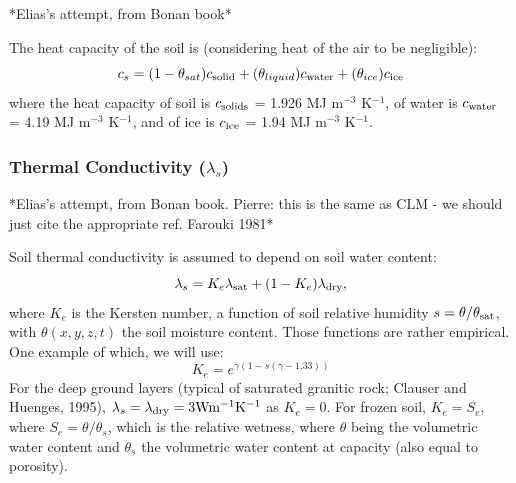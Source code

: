 \documentclass{article}
\begin{document}
*Elias's attempt, from Bonan book*

The heat capacity of the soil is (considering heat of the air to be negligible):
\begin{equation}
c_s = (1- \theta_{sat} ) c_{\rm solid} + (\theta_{liquid}) c_{\rm water} + (\theta_{ice}) c_{\rm ice}
\end{equation}
where the heat capacity of soil is $c_{\rm solids}$ = 1.926 MJ m$^{-3}$ K$^{-1}$, of water is $c_{\rm water}$ = 4.19 MJ m$^{-3}$ K$^{-1}$, and of ice is $c_{\rm ice}$ = 1.94 MJ m$^{-3}$ K$^{-1}$. 

\subsubsection{Thermal Conductivity ($\lambda_s$)}
*Elias's attempt, from Bonan book. Pierre: this is the same as CLM - we should just cite the appropriate ref. Farouki 1981*

Soil thermal conductivity is assumed to depend on soil water content:
\begin{equation}
\lambda_s = K_e \lambda_{\rm sat} + (1-K_e) \lambda_{\rm dry},
\end{equation}
where $K_e$ is the Kersten number, a function of soil relative humidity $s=\theta/\theta_{\rm sat}$, with $\theta(x,y,z,t)$ the soil moisture content. Those functions are rather empirical. One example of which, we will use:
\begin{equation}
K_e = e^{ \gamma(1-s(\gamma-1.33))}
\end{equation} 
For  the  deep  ground  layers  (typical  of  saturated  granitic  rock;  Clauser  and  Huenges,  1995), $\lambda_s =  \lambda_{\rm dry} = 3 \rm W  m^{-1}  K^{-1}$ as $K_e=0$.
For frozen soil, $K_e=S_e$, where $S_e=\theta / \theta_s$, which is the relative wetness, where $\theta$ being the volumetric water content and $\theta_s$ the volumetric water content at capacity (also equal to porosity).
\end{document}
